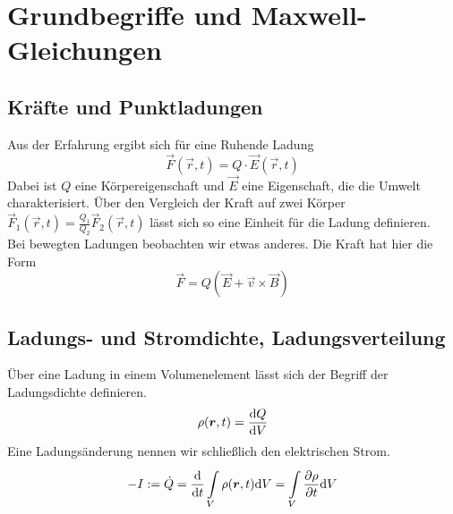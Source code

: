 \chapter{Grundbegriffe und Maxwell-Gleichungen}
\section{Kräfte und Punktladungen}
Aus der Erfahrung ergibt sich für eine Ruhende Ladung
\begin{equation}
\vec{F}(\vec{r},t)=Q\cdot\vec{E}(\vec{r},t)
\end{equation}
Dabei ist $Q$ eine Körpereigenschaft und $\vec{E}$ eine Eigenschaft, die die Umwelt charakterisiert. Über den Vergleich der Kraft auf zwei Körper $\vec{F}_1(\vec{r},t)=\frac{Q_1}{Q_2}\vec{F}_2(\vec{r},t)$ lässt sich so eine Einheit für die Ladung definieren.\\
\linebreak
Bei bewegten Ladungen beobachten wir etwas anderes. Die Kraft hat hier die Form
\begin{equation}
\vec{F}=Q(\vec{E}+\vec{v}\times\vec{B})
\end{equation}
\section{Ladungs- und Stromdichte, Ladungsverteilung}
Über eine Ladung in einem Volumenelement lässt sich der Begriff der Ladungsdichte definieren.
\begin{equation}
\rho(\bm{r},t)=\frac{\mathrm{d}{Q}}{\mathrm{d}{V}}
\end{equation}
Eine Ladungsänderung nennen wir schließlich den elektrischen Strom.
\begin{equation}
-I:=\dot{Q}=\frac{\mathrm{d}{}}{\mathrm{d}{t}}\int\limits_{V}^{} \rho(\bm{r},t) \mathrm{d} V=\int\limits_{V}^{} \frac{\partial{\rho}}{\partial{t}} \mathrm{d} V
\end{equation}